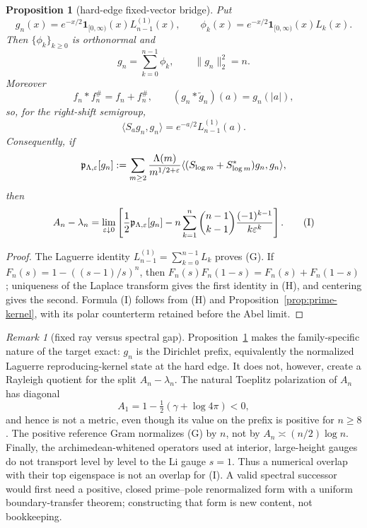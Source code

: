 \documentclass[11pt]{amsart}
\newtheorem{proposition}[theorem]{Proposition}
\theoremstyle{definition}
\theoremstyle{remark}
\newtheorem{remark}[theorem]{Remark}
\theoremstyle{definition}
\begin{document}
\begin{proposition}[hard-edge fixed-vector bridge]\label{prop:hard-edge-fixed-vector}
Put
\[
 g_n(x)=e^{-x/2}\mathbf1_{[0,\infty)}(x)L_{n-1}^{(1)}(x),
 \qquad
 \phi_k(x)=e^{-x/2}\mathbf1_{[0,\infty)}(x)L_k(x).
\]
Then $\{\phi_k\}_{k\ge0}$ is orthonormal and
\[
 \boxed{\quad
 g_n=\sum_{k=0}^{n-1}\phi_k,\qquad \|g_n\|_2^2=n.
 \quad}                                                       \tag{G}
\]
Moreover
\[
 f_n*f_n^\#=f_n+f_n^\#,\qquad
 (g_n*\widetilde g_n)(a)=g_n(|a|),
\]
so, for the right-shift semigroup,
\[
 \boxed{\quad
 \langle S_ag_n,g_n\rangle
 =e^{-a/2}L_{n-1}^{(1)}(a).
 \quad}                                                       \tag{H}
\]
Consequently, if
\[
 \mathfrak p_{\Lambda,\varepsilon}[g_n]
 :=\sum_{m\ge2}{\Lambda(m)\over m^{1/2+\varepsilon}}
 \langle(S_{\log m}+S_{\log m}^*)g_n,g_n\rangle,
\]
then
\[
 A_n-\lambda_n
 =\lim_{\varepsilon\downarrow0}
 \left[
 {1\over2}\mathfrak p_{\Lambda,\varepsilon}[g_n]
 -n\sum_{k=1}^n\binom{n-1}{k-1}{(-1)^{k-1}\over k\varepsilon^k}
 \right].                                                     \tag{I}
\]
\end{proposition}

\begin{proof}
The Laguerre identity
$L_{n-1}^{(1)}=\sum_{k=0}^{n-1}L_k$ proves (G).  If
$F_n(s)=1-((s-1)/s)^n$, then
$F_n(s)F_n(1-s)=F_n(s)+F_n(1-s)$; uniqueness of the Laplace transform gives
the first identity in (H), and centering gives the second.  Formula (I)
follows from (H) and Proposition~\ref{prop:prime-kernel}, with its polar
counterterm retained before the Abel limit.
\end{proof}

\begin{remark}[fixed ray versus spectral gap]\label{rmk:fixed-ray-whitening}
Proposition~\ref{prop:hard-edge-fixed-vector} makes the family-specific
nature of the target exact: $g_n$ is the Dirichlet prefix, equivalently the
normalized Laguerre reproducing-kernel state at the hard edge.  It does not,
however, create a Rayleigh quotient for the split $A_n-\lambda_n$.  The
natural Toeplitz polarization of $A_n$ has diagonal
\[
 A_1=1-\tfrac12(\gamma+\log4\pi)<0,
\]
and hence is not a metric, even though its value on the prefix is positive
for $n\ge8$.  The positive reference Gram normalizes (G) by $n$, not by
$A_n\asymp(n/2)\log n$.  Finally, the archimedean-whitened operators used at
interior, large-height gauges do not transport level by level to the Li
gauge $s=1$.  Thus a numerical overlap with their top eigenspace is not an
overlap for (I).  A valid spectral successor would first need a positive,
closed prime--pole renormalized form with a uniform boundary-transfer
theorem; constructing that form is new content, not bookkeeping.
\end{remark}
\end{document}
